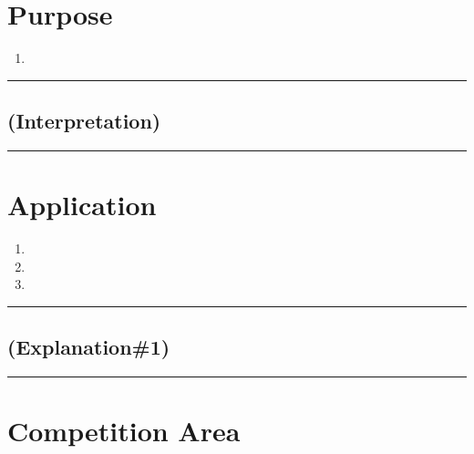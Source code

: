 \documentclass[draft]{report}
\author{}
\date{}
\providecommand{\tightlist}{%
  \setlength{\itemsep}{0pt}\setlength{\parskip}{0pt}}
\newenvironment{expl}[0]%
  {\rule{\textwidth}{.2pt}\footnotesize}%
  {\rule{\textwidth}{.2pt}\normalsize}
\begin{document}
\chapter{Purpose}\label{purpose}

\begin{enumerate}
\tightlist
\item

\end{enumerate}

\begin{expl}
\section{(Interpretation)}\label{interpretation}

\end{expl}

\chapter{Application}\label{application}

\begin{enumerate}
\item

\item

\item

\end{enumerate}

\begin{expl}
\section{(Explanation\#1)}\label{explanation1}

\end{expl}


\chapter{Competition Area}\label{competition-area}
\end{document}
